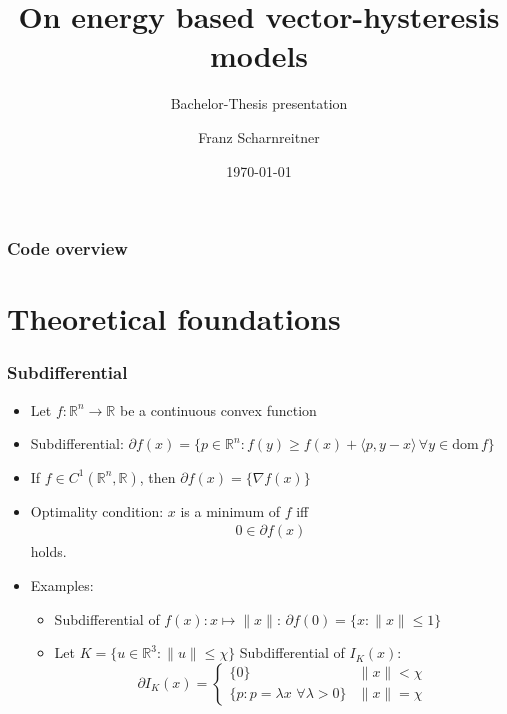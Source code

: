 \documentclass[utf8,aspectratio=169,ngerman,english]{beamer}
\begin{document}
\title{On energy based vector-hysteresis models}

\subtitle{Bachelor-Thesis presentation}

\author{Franz Scharnreitner}



\date{\today}

\maketitle


\begin{frame}
\frametitle{Code overview}
 \tableofcontents
\end{frame}

\section{Theoretical foundations}
\begin{frame}
 \frametitle{Subdifferential \cite{rockafellar1997convex}}

 \begin{itemize}
    \item Let $f: \mathbb R^n \to \mathbb R$ be a continuous convex function
    \item Subdifferential: $\partial f(x) = \{p \in \mathbb R^n: f(y) \geq f(x) + \langle p, y - x \rangle \, \forall y \in \text{dom}\, f\}$
    \item If $f \in C^1(\mathbb R^n,\mathbb R)$, then $\partial f(x) = \{\nabla f(x)\}$
     \item Optimality condition: $x$ is a minimum of $f$ iff \begin{align}
                                                        0 \in \partial f(x)
                                                       \end{align}
        holds.
    \item Examples:
     \begin{itemize}
      \item Subdifferential of $f(x): x \mapsto \|x\|$: $\partial f(0) = \{x : \|x\| \leq 1 \}$
      \item Let $K = \{u \in \mathbb R^3 : \|u\| \leq \chi \} $ Subdifferential of $I_K(x):$
      $$\partial I_K(x) = \begin{cases}\{0\} & \|x\| < \chi \\ \{p : p = \lambda x \,\, \forall \lambda > 0 \} & \|x\| = \chi \end{cases}$$
     \end{itemize}



 \end{itemize} 

\end{frame}
\end{document}
